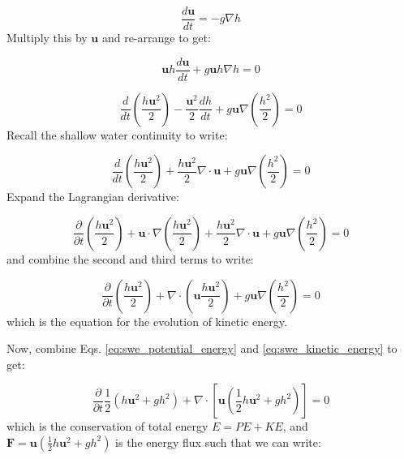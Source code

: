\documentclass[12pt]{article}
\numberwithin{equation}{section}
\numberwithin{figure}{section}
\numberwithin{table}{section}
\begin{document}
\begin{equation}
  \frac{d\mathbf{u}}{dt} = - g \nabla h
\end{equation}
Multiply this by $\mathbf{u}$ and re-arrange to get:

\begin{equation}
  \mathbf{u} h \frac{d\mathbf{u}}{dt} + g\mathbf{u}h\nabla h = 0
\end{equation}

\begin{equation}
  \frac{d}{dt} \left( \frac{h \mathbf{u}^2}{2} \right)
  - \frac{\mathbf{u}^2}{2} \frac{dh}{dt}
  + g\mathbf{u}\nabla \left(\frac{h^2}{2}\right)
  = 0
\end{equation}
Recall the shallow water continuity to write:

\begin{equation}
  \frac{d}{dt} \left( \frac{h \mathbf{u}^2}{2} \right)
  + \frac{h\mathbf{u}^2}{2} \nabla \cdot \mathbf{u}
  + g\mathbf{u}\nabla \left(\frac{h^2}{2}\right)
  = 0
\end{equation}
Expand the Lagrangian derivative:

\begin{equation}
  \frac{\partial}{\partial t} \left( \frac{h \mathbf{u}^2}{2} \right)
  + \mathbf{u} \cdot \nabla \left( \frac{h \mathbf{u}^2}{2} \right)
  + \frac{h\mathbf{u}^2}{2} \nabla \cdot \mathbf{u}
  + g\mathbf{u}\nabla \left(\frac{h^2}{2}\right)
  = 0
\end{equation}
and combine the second and third terms to write:

\begin{equation}
  \frac{\partial}{\partial t} \left( \frac{h \mathbf{u}^2}{2} \right)
  + \nabla \cdot \left( \mathbf{u} \frac{h \mathbf{u}^2}{2} \right)
  + g\mathbf{u}\nabla \left(\frac{h^2}{2}\right)
  = 0
  \label{eq:swe_kinetic_energy}
\end{equation}
which is the equation for the evolution of kinetic energy.

Now, combine Eqs. \ref{eq:swe_potential_energy} and \ref{eq:swe_kinetic_energy} to get:

\begin{equation}
  \frac{\partial}{\partial t} \frac{1}{2} \left(h\mathbf{u}^2 + gh^2\right)
  + \nabla \cdot \left[ \mathbf{u} \left( \frac{1}{2} h\mathbf{u}^2 + gh^2\right) \right] = 0
\end{equation}
which is the conservation of total energy $E = PE + KE$, and
$\mathbf{F} = \mathbf{u} \left( \frac{1}{2} h\mathbf{u}^2 + gh^2\right)$ is the energy flux
such that we can write:
\end{document}
